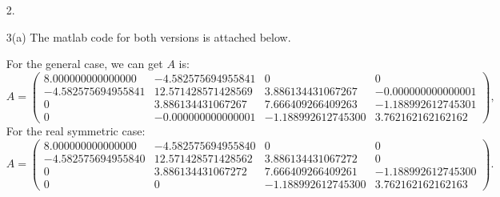 \documentclass[letterpaper]{article}
\begin{document}
\begin{enumerate}
	\item[2.]
	
	
	
    \item[3(a)]\sol
The matlab code for both versions is attached below.

For the general case, we can get $A$ is:
  \begin{equation*}
    A=\begin{pmatrix}
        8.000000000000000&  -4.582575694955841&   0&   0\\
      -4.582575694955841&  12.571428571428569 &  3.886134431067267 & -0.000000000000001\\
      0 &  3.886134431067267 &  7.666409266409263 & -1.188992612745301\\
      0  &-0.000000000000001 & -1.188992612745300 &  3.762162162162162
    \end{pmatrix},
  \end{equation*}
For the real symmetric case:
    \begin{equation*}
    A=\begin{pmatrix}
           8.000000000000000 & -4.582575694955840     &              0       &            0\\
            -4.582575694955840  &12.571428571428562  & 3.886134431067272     &              0\\
                   0  & 3.886134431067272  & 7.666409266409261 & -1.188992612745300\\
                   0    &               0 & -1.188992612745300 &  3.762162162162163
    \end{pmatrix}.
  \end{equation*}


\end{enumerate}
\end{document}
